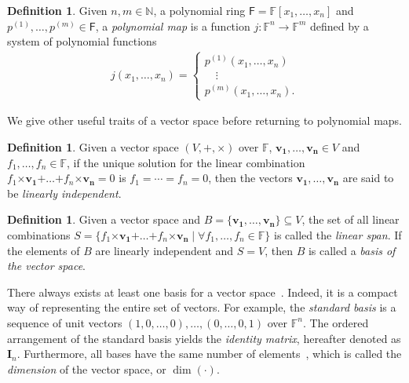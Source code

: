 \documentclass[draft, 12pt, a4paper, oneside]{memoir}
\theoremstyle{definition}
\newtheorem{definition}[theorem]{Definition}
\begin{document}
\begin{definition}\label{def:polymap}
  Given $n, m \in \mathbb{N}$, a polynomial ring $\mathsf{F} = \mathbb{F}[x_{1}, \dots, x_{n}]$ and $p^{(1)}, \dots, p^{(m)} \in \mathsf{F}$, a \emph{polynomial map} is a function $j : \mathbb{F}^{n} \to \mathbb{F}^{m}$ defined by a system of polynomial functions
  \begin{align*}
    j(x_{1}, \dots, x_{n}) =
    \begin{cases}
      p^{(1)}(x_{1}, \dots, x_{n}) \\
      \quad \vdots \\
      p^{(m)}(x_{1}, \dots, x_{n}).
    \end{cases}
  \end{align*}
\end{definition}

We give other useful traits of a vector space before returning to polynomial maps.

\begin{definition}
  Given a vector space $(V, \bm{+}, \bm{\times})$ over $\mathbb{F}$, $\mathbf{v_{1}}, \dots, \mathbf{v_{n}} \in V$ and $f_{1}, \dots, f_{n} \in \mathbb{F}$, if the unique solution for the linear combination $f_{1} \bm{\times} \mathbf{v_{1}} \bm{+} \dots \bm{+} f_{n} \bm{\times} \mathbf{v_{n}} = 0$ is $f_{1} = \cdots = f_{n} = 0$, then the vectors $\mathbf{v_{1}}, \dots, \mathbf{v_{n}}$ are said to be \emph{linearly independent}.
\end{definition}

\begin{definition}
  Given a vector space and $B = \{\mathbf{v_{1}}, \dots, \mathbf{v_{n}}\} \subseteq V$, the set of all linear combinations $S = \{ f_{1} \bm{\times} \mathbf{v_{1}} \bm{+} \dots \bm{+} f_{n} \bm{\times} \mathbf{v_{n}} \mid \forall f_{1}, \dots, f_{n} \in \mathbb{F} \}$ is called the \emph{linear span}. If the elements of $B$ are linearly independent and $S = V$, then $B$ is called a \emph{basis of the vector space}.
\end{definition}

There always exists at least one basis for a vector space~\cite[p. 409, Prop. 1]{Dummit:2003}. Indeed, it is a compact way of representing the entire set of vectors. For example, the \emph{standard basis} is a sequence of unit vectors $(1, 0, \dots, 0), \dots, (0, \dots, 0, 1)$ over $\mathbb{F}^{n}$. The ordered arrangement of the standard basis yields the \emph{identity matrix}, hereafter denoted as $\mathbf{I}_{n}$. Furthermore, all bases have the same number of elements~\cite[p. 411, Cor. 4]{Dummit:2003}, which is called the \emph{dimension} of the vector space, or $\dim(\cdot)$. 
\end{document}
